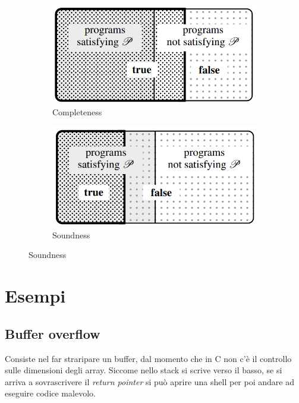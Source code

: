 \documentclass[a4paper,oneside,titlepage]{book}
\begin{document}
\begin{figure}[htp]
	\begin{subfigure}{0.49\textwidth}
	    \centering
		\includegraphics[width=\textwidth, height=\textheight, keepaspectratio]{completeness.png}
		\caption{Completeness}
	\end{subfigure}
	\hfill
	\begin{subfigure}{0.49\textwidth}
	    \centering
		\includegraphics[width=\textwidth, height=\textheight, keepaspectratio]{soundness.png}
		\caption{Soundness}
	\end{subfigure}
\end{figure}


\section{Esempi} %
\subsection{Buffer overflow}
Consiste nel far straripare un buffer, dal momento che in C non c'è il controllo sulle dimensioni degli array. Siccome nello stack si scrive verso il basso, se si arriva a sovrascrivere il \textit{return pointer} si può aprire una shell per poi andare ad eseguire codice malevolo.
\end{document}
